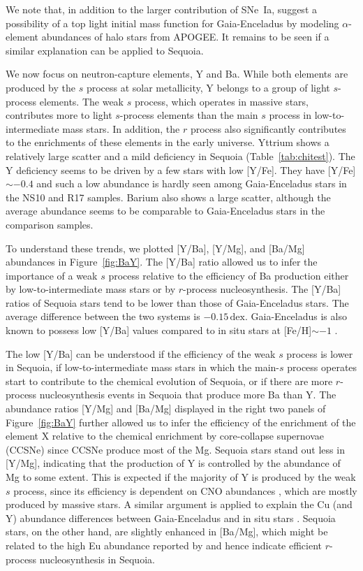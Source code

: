 \documentclass{aa}
\begin{document}
We note that, in addition to the larger contribution of SNe~Ia, \citet{FernandezAlvar2019a} suggest a possibility of a top light initial mass function for Gaia-Enceladus by modeling $\alpha$-element abundances of halo stars from APOGEE.
It remains to be seen if a similar explanation can be applied to Sequoia.  

We now focus on neutron-capture elements, Y and Ba.
While both elements are produced by the $s$ process at solar metallicity, Y belongs  to a group of light $s$-process elements.
The weak $s$ process, which operates in massive stars, contributes more to light $s$-process elements than the main $s$ process in low-to-intermediate mass stars.
In addition, the $r$ process also significantly contributes to the enrichments of these elements in the early universe.
Yttrium shows a relatively large scatter and a mild deficiency in Sequoia (Table~\ref{tab:chitest}). 
The Y deficiency seems to be driven by a few stars with low [{Y}/{Fe}].
They have [{Y}/{Fe}]$\sim -0.4$ and such a low abundance is hardly seen among Gaia-Enceladus stars in the NS10 and R17 samples.
Barium also shows a large scatter, although the average abundance seems to be comparable to Gaia-Enceladus stars in the comparison samples.

To understand these trends, we plotted [{Y}/{Ba}], [{Y}/{Mg}], and [{Ba}/{Mg}] abundances in Figure~\ref{fig:BaY}.
The [{Y}/{Ba}] ratio allowed us to infer the importance of a weak $s$ process relative to the efficiency of Ba production either by low-to-intermediate mass stars or by $r$-process nucleosynthesis.
The [{Y}/{Ba}] ratios of Sequoia stars tend to be lower than those of Gaia-Enceladus stars. 
The average difference between the two systems is $-0.15\,\mathrm{dex}$.
Gaia-Enceladus is also known to possess low [{Y}/{Ba}] values compared to in situ stars at [{Fe}/{H}]$\sim -1$ \citep{Nissen2011}. 

The low [{Y}/{Ba}] can be understood if the efficiency of the weak $s$ process is lower in Sequoia, if low-to-intermediate mass stars in which the main-$s$ process operates start to contribute to the chemical evolution of Sequoia, or if there are more $r$-process nucleosynthesis events in Sequoia that produce more Ba than Y.
The abundance ratios [{Y}/{Mg}] and [{Ba}/{Mg}] displayed in the right two panels of Figure~\ref{fig:BaY} further allowed us to infer the efficiency of the enrichment of the element X relative to the chemical enrichment by core-collapse supernovae (CCSNe) since CCSNe produce most of the Mg. 
Sequoia stars stand out less in [{Y}/{Mg}], indicating that the production of Y is controlled by the abundance of Mg to some extent. 
This is expected if the majority of Y is produced by the weak $s$ process, since its efficiency is dependent on CNO abundances \citep[e.g.,][]{Prantzos1990a}, which are mostly produced by massive stars.
A similar argument is applied to explain the Cu (and Y) abundance differences between Gaia-Enceladus and in situ stars \citep{Nissen2011,Matsuno2021a}.
Sequoia stars, on the other hand, are slightly enhanced in [{Ba}/{Mg}], which might be related to the high Eu abundance reported by \citet{Aguado2021a} and hence indicate efficient $r$-process nucleosynthesis in Sequoia.
\end{document}
